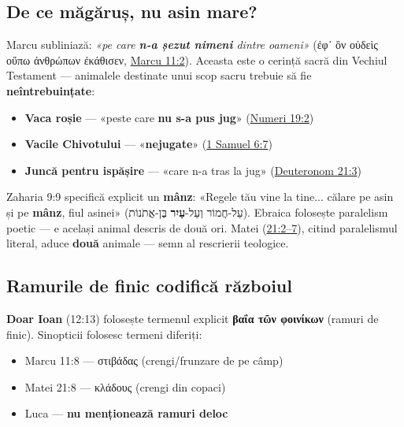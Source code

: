 \documentclass[12pt,a4paper,twoside,openany]{book}
\begin{document}
\subsection{De ce măgăruș, nu asin mare?}

Marcu subliniază: \textit{«pe care \textbf{n-a șezut nimeni} dintre oameni»} (ἐφ᾽ ὃν οὐδεὶς οὔπω ἀνθρώπων ἐκάθισεν, \href{https://bibliaortodoxa.ro/carte.php?id=53\&cap=11\#2}{Marcu 11:2}). Aceasta este o cerință sacră din Vechiul Testament — animalele destinate unui scop sacru trebuie să fie \textbf{neîntrebuințate}:

\begin{itemize}
  \item \textbf{Vaca roșie} — «peste care \textbf{nu s-a pus jug}» (\href{https://bibliaortodoxa.ro/carte.php?id=14\&cap=19\#2}{Numeri 19:2})
  \item \textbf{Vacile Chivotului} — «\textbf{nejugate}» (\href{https://bibliaortodoxa.ro/carte.php?id=52\&cap=6\#7}{1 Samuel 6:7})
  \item \textbf{Juncă pentru ispășire} — «care n-a tras la jug» (\href{https://bibliaortodoxa.ro/carte.php?id=17\&cap=21\#3}{Deuteronom 21:3})
\end{itemize}

Zaharia 9:9 specifică explicit un \textbf{mânz}: «Regele tău vine la tine... călare pe asin și pe \textbf{mânz}, fiul asinei» (עַל-חֲמוֹר וְעַל-\textbf{עַיִר} בֶּן-אֲתֹנוֹת). Ebraica folosește paralelism poetic — e același animal descris de două ori. Matei (\href{https://bibliaortodoxa.ro/carte.php?id=55\&cap=21\#2}{21:2--7}), citind paralelismul literal, aduce \textbf{două} animale — semn al rescrierii teologice.

\subsection{Ramurile de finic codifică războiul}

\textbf{Doar Ioan} (12:13) folosește termenul explicit \textbf{βαΐα τῶν φοινίκων} (ramuri de finic). Sinopticii folosesc termeni diferiți:

\begin{itemize}
  \item Marcu 11:8 — στιβάδας (crengi/frunzare de pe câmp)
  \item Matei 21:8 — κλάδους (crengi din copaci)
  \item Luca — \textbf{nu menționează ramuri deloc}
\end{itemize}
\end{document}
